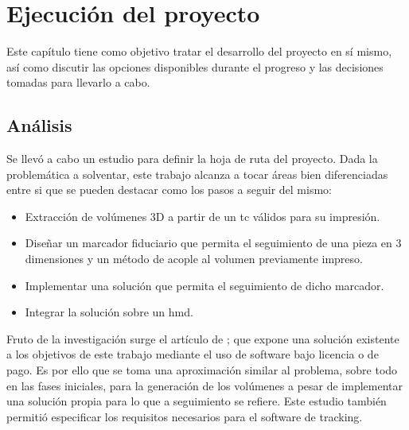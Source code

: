 \chapter{Ejecución del proyecto}
\label{chap:edp}
Este capítulo tiene como objetivo tratar el desarrollo del proyecto en sí mismo, así como discutir las opciones disponibles durante el progreso y las decisiones tomadas para llevarlo a cabo.
\section{Análisis}
Se llevó a cabo un estudio para definir la hoja de ruta del proyecto. Dada la problemática a solventar, este trabajo alcanza a tocar áreas bien diferenciadas entre si que se pueden destacar como los pasos a seguir del mismo:
\begin{itemize}
	\item Extracción de volúmenes 3D a partir de un \acrshort{tc} válidos para su impresión.
	\item Diseñar un marcador fiduciario que permita el seguimiento de una pieza en 3 dimensiones y un método de acople al volumen previamente impreso.
	\item Implementar una solución que permita el seguimiento de dicho marcador.
	\item Integrar la solución sobre un \acrshort{hmd}.
\end{itemize}

Fruto de la investigación surge el artículo de  \citeauthor{MoretaMartinez2020}; que expone una solución existente a los objetivos de este trabajo mediante el uso de software bajo licencia o de pago.  Es por ello que se toma una aproximación similar al problema, sobre todo en las fases iniciales, para la generación de los volúmenes a pesar de implementar una solución propia para lo que a seguimiento se refiere. Este estudio también permitió especificar los requisitos necesarios para el software de tracking.

